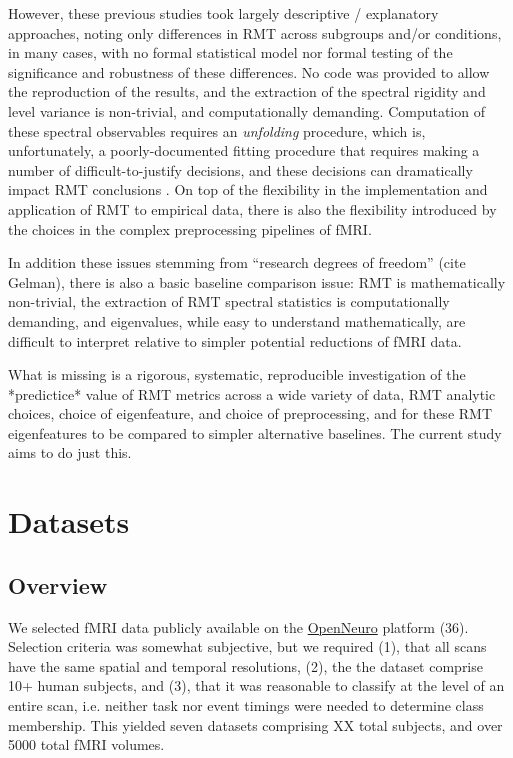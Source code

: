 \documentclass[12pt]{spieman}  %
\begin{document}
\begin{spacing}{2}
However, these previous studies took largely descriptive / explanatory
approaches, noting only differences in RMT across subgroups and/or conditions,
in many cases, with no formal statistical model nor formal testing of the
significance and robustness of these differences. No code was provided to allow
the reproduction of the results, and the extraction of the spectral rigidity
and level variance is non-trivial, and computationally demanding. Computation
of these spectral observables requires an \textit{unfolding}
procedure\cite{guhrRandommatrixTheoriesQuantum1998a,mehtaRandomMatrices2004},
which is, unfortunately, a poorly-documented fitting procedure that requires
making a number of difficult-to-justify decisions, and these decisions can
dramatically impact RMT conclusions
\cite{abul-magdUnfoldingSpectrumChaotic2014,abueleninSpectralUnfoldingChaotic2018,fossionRandommatrixSpectraTime2013,abueleninEffectUnfoldingSpectral2012,moralesImprovedUnfoldingDetrending2011}.
On top of the flexibility in the implementation and application of RMT to
empirical data, there is also the flexibility introduced by the choices in the
complex preprocessing pipelines of fMRI\cite{parkerBenefitSliceTiming2019}.

In addition these issues stemming from ``research degrees of freedom'' (cite
Gelman), there is also a basic baseline comparison issue: RMT is mathematically
non-trivial, the extraction of RMT spectral statistics is computationally
demanding, and eigenvalues, while easy to understand mathematically, are
difficult to interpret relative to simpler potential reductions of fMRI data.

What is missing is a rigorous, systematic, reproducible investigation of the
*predictice* value of RMT metrics across a wide variety of data, RMT analytic
choices, choice of eigenfeature, and choice of preprocessing, and for these RMT
eigenfeatures to be compared to simpler alternative baselines. The current
study aims to do just this.


\section{Datasets}
\label{sec:datasets}

\subsection{Overview}

We selected fMRI data publicly available on the
\href{https://openneuro.org/}{OpenNeuro} platform (36). Selection criteria was
somewhat subjective, but we required (1), that all scans have the same spatial
and temporal resolutions, (2), the the dataset comprise 10+ human subjects, and
(3), that it was reasonable to classify at the level of an entire scan, i.e.
neither task nor event timings were needed to determine class membership. This
yielded seven datasets comprising XX total subjects, and over 5000 total fMRI
volumes.



\end{spacing}
\end{document}

